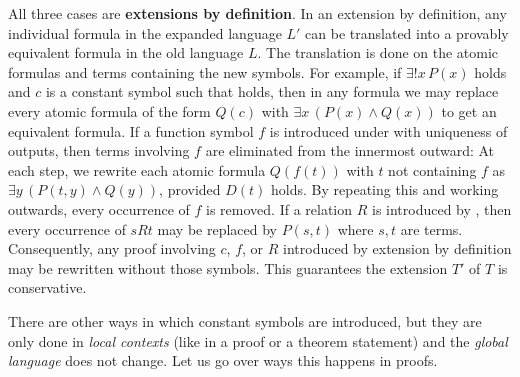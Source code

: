 All three cases are \textbf{extensions by definition}.
In an extension by definition, any individual formula in the expanded language $L'$ can be translated into a provably equivalent formula in the old language $L$. 
The translation is done on the atomic formulas and terms containing the new symbols. 
For example, if $\exists ! x\, P(x)$ holds and $c$ is a constant symbol such that  holds, then in any formula we may replace every atomic formula of the form $Q(c)$ with $\exists x\, (P(x)\land Q(x))$ to get an equivalent formula.
If a function symbol $f$ is introduced under  with uniqueness of outputs, then terms involving $f$ are eliminated from the innermost outward:
At each step, we rewrite each atomic formula $Q(f(t))$ with $t$ not containing $f$ as $\exists y\, (P(t, y)\land Q(y))$, provided $D(t)$ holds. 
By repeating this and working outwards, every occurrence of $f$ is removed. 
If a relation $R$ is introduced by , then every occurrence of $sRt$ may be replaced by $P(s, t)$ where $s, t$ are terms. 
Consequently, any proof involving $c$, $f$, or $R$ introduced by extension by definition may be rewritten without those symbols. 
This guarantees the extension $T'$ of $T$ is conservative.

There are other ways in which constant symbols are introduced, but they are only done in \emph{local contexts} (like in a proof or a theorem statement) and the \emph{global language} does not change.
Let us go over ways this happens in proofs. 

